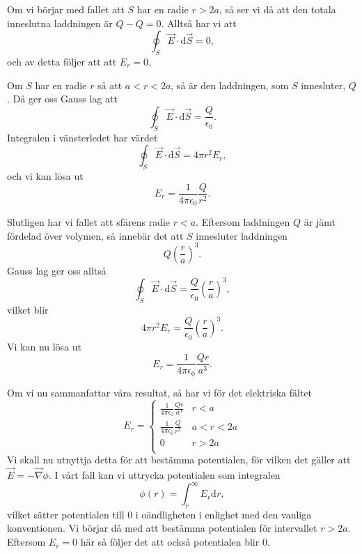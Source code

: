 \documentclass[%
oneside,                 %
final,                   %
10pt]{article}
\begin{document}
Om vi börjar med fallet att $S$ har en radie $r > 2a$, så ser vi 
då att den totala inneslutna laddningen är $Q - Q = 0$.  Alltså har
vi att 
\begin{equation}
  \oint_S \vec{E} \cdot \mbox{d}\vec{S} = 0,
\end{equation}
och av detta följer att att $E_r = 0$.

Om $S$ har en radie $r$ så att $a < r < 2a$, så är den laddningen,
som $S$ innesluter, $Q$.  Då ger oss Gauss lag att
\begin{equation}
  \oint_S \vec{E} \cdot \mbox{d}\vec{S} = \frac{Q}{\epsilon_0}.
\end{equation}
Integralen i vänsterledet har värdet
\begin{equation}
  \oint_S \vec{E} \cdot \mbox{d}\vec{S} = 4\pi r^2 E_r,
\end{equation}
och vi kan lösa ut
\begin{equation}
  E_r = \frac{1}{4\pi \epsilon_0} \frac{Q}{r^2}.
\end{equation}

Slutligen har vi fallet att sfärens radie $r < a$.  Eftersom laddningen $Q$
är jämt fördelad över volymen, så innebär det att $S$ innesluter
laddningen
\begin{equation}
  Q \left(\frac{r}{a}\right)^3.
\end{equation}
Gauss lag ger oss allts\aa
\begin{equation}
  \oint_S \vec{E} \cdot \mbox{d}\vec{S} = \frac{Q}{\epsilon_0}
\left(\frac{r}{a}\right)^3,
\end{equation}
vilket blir
\begin{equation}
  4\pi r^2 E_r = \frac{Q}{\epsilon_0}\left(\frac{r}{a}\right)^3.
\end{equation}
Vi kan nu lösa ut 
\begin{equation}
  E_r = \frac{1}{4\pi \epsilon_0} \frac{Qr}{a^3}.
\end{equation}

Om vi nu sammanfattar våra resultat, så har vi för det elektriska
fältet
\begin{equation}
  E_r = \left\{\begin{array}{lr}
\frac{1}{4\pi \epsilon_0} \frac{Qr}{a^3} & r < a\\
\frac{1}{4\pi \epsilon_0} \frac{Q}{r^2} & a < r < 2a\\
0 & r > 2a\\
\end{array}\right.
\end{equation}
Vi skall nu utnyttja detta för att bestämma potentialen, för vilken det
gäller att $\vec{E} = - \vec{\nabla} \phi$.  I vårt fall kan vi uttrycka 
potentialen som integralen
\begin{equation}
  \phi\left(r\right) = \int_r^\infty E_r \mbox{d}r,
\end{equation}
vilket sätter potentialen till 0 i oändligheten i enlighet med den vanliga
konventionen.  Vi börjar då med att bestämma potentialen för intervallet
$r > 2a$.  Eftersom $E_r = 0$ här så följer det att också potentialen
blir 0.  
\end{document}
